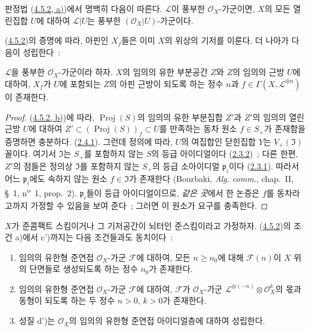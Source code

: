 판정법 (\hyperref[II.4.5.2-ko]{4.5.2, a)})에서 명백히 다음이 따른다.
$\mathcal{L}$이 풍부한 $\mathcal{O}_X$-가군이면, $X$의 모든 열린집합
$U$에 대하여 $\mathcal{L}|U$는 풍부한
$(\mathcal{O}_X|U)$-가군이다.

(\hyperref[II.4.5.2-ko]{4.5.2})의 증명에 따라, 아핀인 $X_f$들은 이미
$X$의 위상의 기저를 이룬다. 더 나아가 다음이 성립한다~:

\begin{corollary}[4.5.4]
\label{II.4.5.4-ko}
$\mathcal{L}$을 풍부한 $\mathcal{O}_X$-가군이라 하자. $X$의 임의의 유한
부분공간 $Z$와 $Z$의 임의의 근방 $U$에 대하여, $X_f$가 $U$에 포함되는
$Z$의 아핀 근방이 되도록 하는 정수 $n$과
$f\in\Gamma(X,\mathcal{L}^{\otimes n})$이 존재한다.
\end{corollary}

\begin{proof}

(\hyperref[II.4.5.2-ko]{4.5.2, b)})에 따라, $\operatorname{Proj}(S)$의
임의의 유한 부분집합 $Z'$과 $Z'$의 임의의 열린 근방 $U$에 대하여
$Z'\subset(\operatorname{Proj}(S))_f\subset U$를 만족하는 동차 원소
$f\in S_+$가 존재함을 증명하면 충분하다.
(\hyperref[II.2.4.1-ko]{2.4.1}). 그런데 정의에 따라, $U$의 여집합인
닫힌집합 $Y$는 $V_+(\mathfrak{I})$ 꼴이다. 여기서 $\mathfrak{I}$는
$S_+$를 포함하지 않는 $S$의 등급 아이디얼이다
(\hyperref[II.2.3.2-ko]{2.3.2})~; 다른 한편, $Z'$의 점들은 정의상
$\mathfrak{I}$를 포함하지 않는 $S_+$의 등급 소아이디얼
$\mathfrak{p}_i$이다 (\hyperref[II.2.3.1-ko]{2.3.1}). 따라서 어느
$\mathfrak{p}_i$에도 속하지 않는 원소 $f\in\mathfrak{I}$가 존재한다
(Bourbaki, \emph{Alg. comm.}, chap.~II, \S~1,
n\textsuperscript{o}~1, prop.~2). $\mathfrak{p}_i$들이 등급
아이디얼이므로, \emph{같은 곳}에서 한 논증은 $f$를 동차라고까지
가정할 수 있음을 보여 준다~; 그러면 이 원소가 요구를 충족한다.
\end{proof}

\begin{proposition}[4.5.5]
\label{II.4.5.5-ko}
$X$가 준콤팩트 스킴이거나 그 기저공간이 뇌터인 준스킴이라고 가정하자.
(\hyperref[II.4.5.2-ko]{4.5.2})의 조건 a)에서 c')까지는 다음 조건들과도
동치이다~:
\begin{enumerate}
  \item[\rm{d)}] 임의의 유한형 준연접 $\mathcal{O}_X$-가군
  $\mathcal{F}$에 대하여, 모든 $n\geq n_0$에 대해 $\mathcal{F}(n)$이
  $X$ 위의 단면들로 생성되도록 하는 정수 $n_0$가 존재한다.
  \item[\rm{d')}] 임의의 유한형 준연접 $\mathcal{O}_X$-가군
  $\mathcal{F}$에 대하여, $\mathcal{F}$가 $\mathcal{O}_X$-가군
  $\mathcal{L}^{\otimes(-n)}\otimes\mathcal{O}_X^k$의 몫과 동형이
  되도록 하는 두 정수 $n>0$, $k>0$가 존재한다.
  \item[\rm{d'')}] 성질 d')는 $\mathcal{O}_X$의 임의의 유한형 준연접
  아이디얼층에 대하여 성립한다.
\end{enumerate}
\end{proposition}

